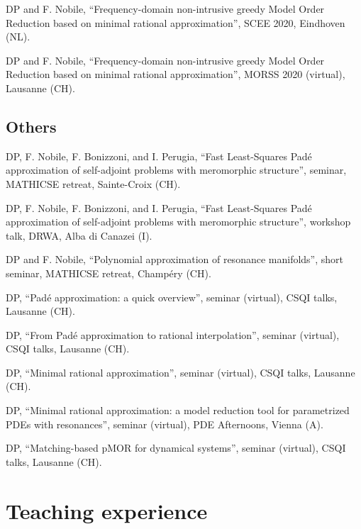 \documentclass[11pt]{article} %
\begin{document}
DP and F. Nobile, ``Frequency-domain non-intrusive greedy Model Order Reduction based on minimal rational approximation'', SCEE 2020, Eindhoven (NL).

\yearsminus DP and F. Nobile, ``Frequency-domain non-intrusive greedy Model Order Reduction based on minimal rational approximation'', MORSS 2020 (virtual), Lausanne (CH).

\subsection*{Others}

\hspace{\parindent}DP, F. Nobile, F. Bonizzoni, and I. Perugia, ``Fast Least-Squares Pad\'e approximation of self-adjoint problems with meromorphic structure'', seminar, \mbox{MATHICSE} retreat, Sainte-Croix (CH).

\yearsminus DP, F. Nobile, F. Bonizzoni, and I. Perugia, ``Fast Least-Squares Pad\'e approximation of self-adjoint problems with meromorphic structure'', workshop talk, DRWA, Alba di Canazei (I).

DP and F. Nobile, ``Polynomial approximation of resonance manifolds'', short seminar, \mbox{MATHICSE} retreat, Champ\'ery (CH).

DP, ``Pad\'e approximation: a quick overview'', seminar (virtual), CSQI talks, Lausanne (CH).

DP, ``From Pad\'e approximation to rational interpolation'', seminar (virtual), CSQI talks, Lausanne (CH).

DP, ``Minimal rational approximation'', seminar (virtual), CSQI talks, Lausanne (CH).

\yearsminus DP, ``Minimal rational approximation: a model reduction tool for parametrized PDEs with resonances'', seminar (virtual), PDE Afternoons, Vienna (A).

DP, ``Matching-based pMOR for dynamical systems'', seminar (virtual), CSQI talks, Lausanne (CH).



\section*{Teaching experience}
\end{document}
